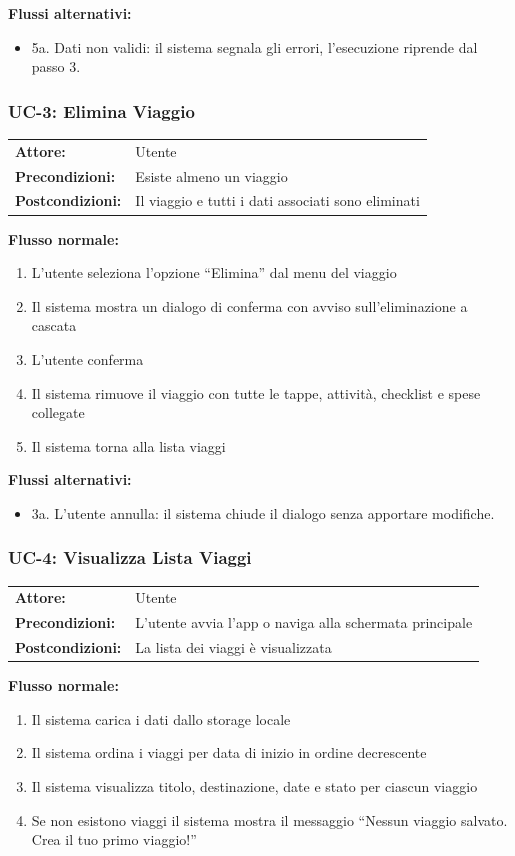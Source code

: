 \documentclass[12pt, a4paper]{article}
\makeatletter
\newcommand{\ucblock}[3]{%
  \noindent
  \begin{tabular}{@{}ll@{}}
    \textbf{Attore:}         & #1 \\
    \textbf{Precondizioni:}  & #2 \\
    \textbf{Postcondizioni:} & #3 \\
  \end{tabular}%
  \medskip
}
\makeatother
\begin{document}
\noindent\textbf{Flussi alternativi:}
\begin{itemize}[leftmargin=1.5em, itemsep=1pt]
  \item 5a. Dati non validi: il sistema segnala gli errori, l'esecuzione riprende dal passo 3.
\end{itemize}

\subsubsection{UC-3: Elimina Viaggio}

\ucblock{Utente}{Esiste almeno un viaggio}{Il viaggio e tutti i dati associati sono eliminati}

\noindent\textbf{Flusso normale:}
\begin{enumerate}[leftmargin=1.5em, itemsep=1pt]
  \item L'utente seleziona l'opzione ``Elimina'' dal menu del viaggio
  \item Il sistema mostra un dialogo di conferma con avviso sull'eliminazione a cascata
  \item L'utente conferma
  \item Il sistema rimuove il viaggio con tutte le tappe, attività, checklist e spese collegate
  \item Il sistema torna alla lista viaggi
\end{enumerate}

\noindent\textbf{Flussi alternativi:}
\begin{itemize}[leftmargin=1.5em, itemsep=1pt]
  \item 3a. L'utente annulla: il sistema chiude il dialogo senza apportare modifiche.
\end{itemize}

\subsubsection{UC-4: Visualizza Lista Viaggi}

\ucblock{Utente}{L'utente avvia l'app o naviga alla schermata principale}{La lista dei viaggi è visualizzata}

\noindent\textbf{Flusso normale:}
\begin{enumerate}[leftmargin=1.5em, itemsep=1pt]
  \item Il sistema carica i dati dallo storage locale
  \item Il sistema ordina i viaggi per data di inizio in ordine decrescente
  \item Il sistema visualizza titolo, destinazione, date e stato per ciascun viaggio
  \item Se non esistono viaggi il sistema mostra il messaggio ``Nessun viaggio salvato.
    Crea il tuo primo viaggio!''
\end{enumerate}
\end{document}
